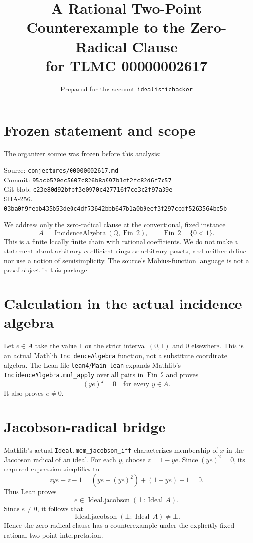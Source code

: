 \documentclass[11pt]{article}
\title{A Rational Two-Point Counterexample to the Zero-Radical Clause\\for TLMC 00000002617}
\author{Prepared for the account \texttt{idealistichacker}}
\date{}
\begin{document}
\maketitle

\section*{Frozen statement and scope}
The organizer source was frozen before this analysis:
\begin{flushleft}
\footnotesize
Source: \texttt{conjectures/00000002617.md}\\
Commit: \texttt{95acb520ec5607c826b8a997b1ef2fc82d6f7c57}\\
Git blob: \texttt{e23e80d92bfbf3e0970c427716f7ce3c2f97a39e}\\
SHA-256: \texttt{03ba0f9febb435b53de0c4df73642bbb647b1a0b9eef3f297cedf5263564bc5b}
\end{flushleft}

We address only the zero-radical clause at the conventional, fixed instance
\[
 A=\operatorname{IncidenceAlgebra}(\mathbb{Q},\operatorname{Fin}\,2),
 \qquad \operatorname{Fin}\,2=\{0<1\}.
\]
This is a finite locally finite chain with rational coefficients. We do not
make a statement about arbitrary coefficient rings or arbitrary posets, and
neither define nor use a notion of semisimplicity. The source's Möbius-function
language is not a proof object in this package.

\section*{Calculation in the actual incidence algebra}
Let \(e\in A\) take the value \(1\) on the strict interval \((0,1)\)
and \(0\) elsewhere. This is an actual Mathlib
\texttt{IncidenceAlgebra} function, not a substitute coordinate algebra.
The Lean file \texttt{lean4/Main.lean} expands Mathlib's
\texttt{IncidenceAlgebra.mul\_apply} over all pairs in
\(\operatorname{Fin}\,2\) and proves
\[
 (ye)^2=0 \quad\text{for every }y\in A.
\]
It also proves \(e\ne0\).

\section*{Jacobson-radical bridge}
Mathlib's actual \texttt{Ideal.mem\_jacobson\_iff} characterizes
membership of \(x\) in the Jacobson radical of an ideal. For each \(y\),
choose \(z=1-ye\). Since \((ye)^2=0\), its required expression simplifies to
\[
 zye+z-1=(ye-(ye)^2)+(1-ye)-1=0.
\]
Thus Lean proves
\[
 e\in\operatorname{Ideal.jacobson}(\bot:\operatorname{Ideal}\,A).
\]
Since \(e\ne0\), it follows that
\[
 \operatorname{Ideal.jacobson}(\bot:\operatorname{Ideal}\,A)\ne\bot.
\]
Hence the zero-radical clause has a counterexample under the explicitly fixed
rational two-point interpretation.
\end{document}
